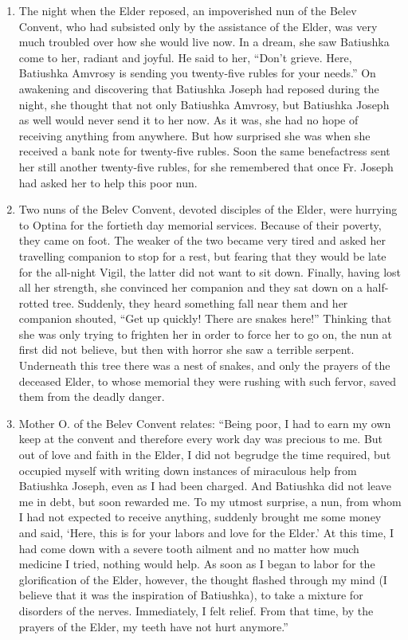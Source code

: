 \begin{enumerate}
\item The night when the Elder reposed, an impoverished nun of the Belev Convent, who had subsisted only by the assistance of the Elder, was very much troubled over how she would live now. In a dream, she saw Batiushka come to her, radiant and joyful. He said to her, ``Don't grieve. Here, Batiushka Amvrosy is sending you twenty-five rubles for your needs.'' On awakening and discovering that Batiushka Joseph had reposed during the night, she thought that not only Batiushka Amvrosy, but Batiushka Joseph as well would never send it to her now. As it was, she had no hope of receiving anything from anywhere. But how surprised she was when she received a bank note for twenty-five rubles. Soon the same benefactress sent her still another twenty-five rubles, for she remembered that once Fr. Joseph had asked her to help this poor nun.

\item Two nuns of the Belev Convent, devoted disciples of the Elder, were hurrying to Optina for the fortieth day memorial services. Because of their poverty, they came on foot. The weaker of the two became very tired and asked her travelling companion to stop for a rest, but fearing that they would be late for the all-night Vigil, the latter did not want to sit down. Finally, having lost all her strength, she convinced her companion and they sat down on a half-rotted tree. Suddenly, they heard something fall near them and her companion shouted, ``Get up quickly! There are snakes here!'' Thinking that she was only trying to frighten her in order to force her to go on, the nun at first did not believe, but then with horror she saw a terrible serpent. Underneath this tree there was a nest of snakes, and only the prayers of the deceased Elder, to whose memorial they were rushing with such fervor, saved them from the deadly danger.

\item Mother O. of the Belev Convent relates: ``Being poor, I had to earn my own keep at the convent and therefore every work day was precious to me. But out of love and faith in the Elder, I did not begrudge the time required, but occupied myself with writing down instances of miraculous help from Batiushka Joseph, even as I had been charged. And Batiushka did not leave me in debt, but soon rewarded me. To my utmost surprise, a nun, from whom I had not expected to receive anything, suddenly brought me some money and said, `Here, this is for your labors and love for the Elder.' At this time, I had come down with a severe tooth ailment and no matter how much medicine I tried, nothing would help. As soon as I began to labor for the glorification of the Elder, however, the thought flashed through my mind (I believe that it was the inspiration of Batiushka), to take a mixture for disorders of the nerves. Immediately, I felt relief. From that time, by the prayers of the Elder, my teeth have not hurt anymore.''


\end{enumerate}
